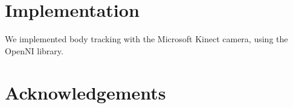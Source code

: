 \documentclass{chi-ext}
\begin{document}
\section{Implementation}
We implemented body tracking with the Microsoft Kinect camera, using the OpenNI library.

\section{Acknowledgements}

%
\end{document}
